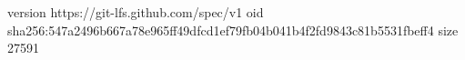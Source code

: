 version https://git-lfs.github.com/spec/v1
oid sha256:547a2496b667a78e965ff49dfcd1ef79fb04b041b4f2fd9843c81b5531fbeff4
size 27591
